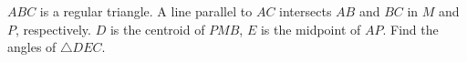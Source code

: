 $ABC$ is a regular triangle. A line parallel to $AC$ intersects $AB$ and $BC$ in $M$ and $P$, respectively. $D$ is the centroid of $PMB$, $E$ is the midpoint of $AP$. Find the angles of $\triangle DEC$.
